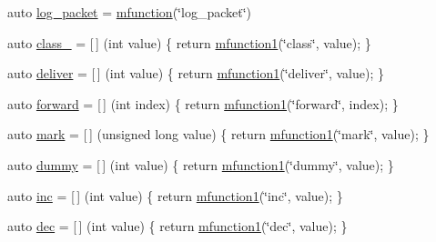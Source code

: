 \begin{DoxyCompactItemize}
\item 
auto \hyperlink{namespacepfq__lang_1_1anonymous__namespace_02default_8hpp_03_a82a9b0e4c53eb28a98e5c34372a5b17b}{log\+\_\+packet} = \hyperlink{namespacepfq__lang_a47d60e7fc6df739692308276b8f6d4e4}{mfunction}(\char`\"{}log\+\_\+packet\char`\"{})
\item 
auto \hyperlink{namespacepfq__lang_1_1anonymous__namespace_02default_8hpp_03_a27a683ef93570a66844e1a0106e6336a}{class\+\_\+} = \mbox{[}$\,$\mbox{]} (int value) \{ return \hyperlink{namespacepfq__lang_a3cc9d61411c0398bb46aa2b33a21f7ed}{mfunction1}(\char`\"{}class\char`\"{}, value); \}
\item 
auto \hyperlink{namespacepfq__lang_1_1anonymous__namespace_02default_8hpp_03_a9baf04657b3da63a2a6d574bbcdafb76}{deliver} = \mbox{[}$\,$\mbox{]} (int value) \{ return \hyperlink{namespacepfq__lang_a3cc9d61411c0398bb46aa2b33a21f7ed}{mfunction1}(\char`\"{}deliver\char`\"{}, value); \}
\item 
auto \hyperlink{namespacepfq__lang_1_1anonymous__namespace_02default_8hpp_03_a7fbe4b2614dd240727bf1696b4d06523}{forward} = \mbox{[}$\,$\mbox{]} (int index) \{ return \hyperlink{namespacepfq__lang_a3cc9d61411c0398bb46aa2b33a21f7ed}{mfunction1}(\char`\"{}forward\char`\"{}, index); \}
\item 
auto \hyperlink{namespacepfq__lang_1_1anonymous__namespace_02default_8hpp_03_ad6142fe3a0fc859f25ea16956f52a5f0}{mark} = \mbox{[}$\,$\mbox{]} (unsigned long value) \{ return \hyperlink{namespacepfq__lang_a3cc9d61411c0398bb46aa2b33a21f7ed}{mfunction1}(\char`\"{}mark\char`\"{}, value); \}
\item 
auto \hyperlink{namespacepfq__lang_1_1anonymous__namespace_02default_8hpp_03_a876b4be1c6cf97e317f74242d8fb3da4}{dummy} = \mbox{[}$\,$\mbox{]} (int value) \{ return \hyperlink{namespacepfq__lang_a3cc9d61411c0398bb46aa2b33a21f7ed}{mfunction1}(\char`\"{}dummy\char`\"{}, value); \}
\item 
auto \hyperlink{namespacepfq__lang_1_1anonymous__namespace_02default_8hpp_03_a14246183085ec07f08ab9b0d53907ae5}{inc} = \mbox{[}$\,$\mbox{]} (int value) \{ return \hyperlink{namespacepfq__lang_a3cc9d61411c0398bb46aa2b33a21f7ed}{mfunction1}(\char`\"{}inc\char`\"{}, value); \}
\item 
auto \hyperlink{namespacepfq__lang_1_1anonymous__namespace_02default_8hpp_03_a6e71e558e459e950a4e9beeaaaf12cf6}{dec} = \mbox{[}$\,$\mbox{]} (int value) \{ return \hyperlink{namespacepfq__lang_a3cc9d61411c0398bb46aa2b33a21f7ed}{mfunction1}(\char`\"{}dec\char`\"{}, value); \}
\item 

\end{DoxyCompactItemize}
